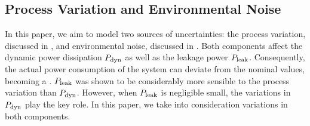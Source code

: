 \subsection{Process Variation and Environmental Noise} 
In this paper, we aim to model two sources of uncertainties: the process variation, discussed in , and environmental noise, discussed in . Both components affect the dynamic power dissipation $P_{\text{dyn}}$ as well as the leakage power $P_{\text{leak}}$. Consequently, the actual power consumption of the system can deviate from the nominal values, becoming a \rv. $P_{\text{leak}}$ was shown to be considerably more sensible to the process variation than $P_{\text{dyn}}$. However, when $P_{\text{leak}}$ is negligible small, the variations in $P_{\text{dyn}}$ play the key role. In this paper, we take into consideration variations in both components.
